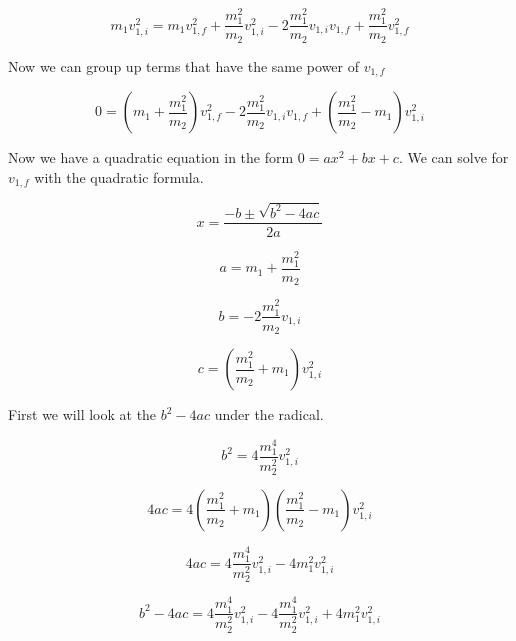 \documentclass[12pt]{book}
\begin{document}
\begin{exampleblock}
\begin{equation}
m_1 v_{1,i}^2 = m_1 v_{1,f}^2 + \frac{m_1^2}{m_2} v_{1,i}^2 - 2 \frac{m_1^2}{m_2} v_{1,i} v_{1,f} + \frac{m_1^2}{m_2} v_{1,f}^2
\end{equation}

Now we can group up terms that have the same power of $v_{1,f}$

\begin{equation}
0 = \left( m_1 + \frac{m_1^2}{m_2} \right) v_{1,f}^2 - 2 \frac{m_1^2}{m_2} v_{1,i} v_{1,f} +\left( \frac{m_1^2}{m_2} - m_1 \right) v_{1,i}^2
\end{equation}

Now we have a quadratic equation in the form $0 = ax^2 + bx + c$. We can solve for $v_{1,f}$ with the quadratic formula.

\begin{equation}
x = \frac{-b \pm \sqrt{b^2 - 4ac}}{2a}
\end{equation}

\begin{equation}
a = m_1 + \frac{m_1^2}{m_2} 
\end{equation}

\begin{equation}
b = -2 \frac{m_1^2}{m_2} v_{1,i}
\end{equation}

\begin{equation}
c = \left( \frac{m_1^2}{m_2} + m_1 \right) v_{1,i}^2
\end{equation}

First we will look at the $b^2 - 4ac$ under the radical.

\begin{equation}
b^2 = 4 \frac{m_1^4}{m_2^2} v_{1,i}^2
\end{equation}

\begin{equation}
4ac = 4 \left( \frac{m_1^2}{m_2} + m_1 \right) \left(\frac{m_1^2}{m_2} - m_1 \right) v_{1,i}^2
\end{equation}

\begin{equation}
4ac = 4 \frac{m_1^4}{m_2^2} v_{1,i}^2 - 4m_1^2 v_{1,i}^2
\end{equation}

\begin{equation}
b^2 - 4ac = 4 \frac{m_1^4}{m_2^2} v_{1,i}^2 - 4 \frac{m_1^4}{m_2^2} v_{1,i}^2 + 4m_1^2 v_{1,i}^2
\end{equation}


\end{exampleblock}
\end{document}
